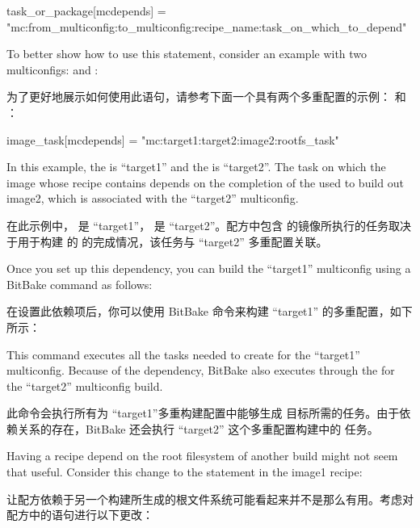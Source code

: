 \begin{pyglist}
task_or_package[mcdepends] = "mc:from_multiconfig:to_multiconfig:recipe_name:task_on_which_to_depend"
\end{pyglist}

To better show how to use this statement, consider an example with two multiconfigs:  and :

为了更好地展示如何使用此语句，请参考下面一个具有两个多重配置的示例： 和 ：

\begin{pyglist}
image_task[mcdepends] = "mc:target1:target2:image2:rootfs_task"
\end{pyglist}

In this example, the  is ``target1'' and the  is ``target2''. The task on which the image whose recipe contains  depends on the completion of the  used to build out image2, which is associated with the ``target2'' multiconfig.

在此示例中，  是 ``target1''， 是 ``target2''。配方中包含  的镜像所执行的任务取决于用于构建  的  的完成情况，该任务与 ``target2'' 多重配置关联。

Once you set up this dependency, you can build the ``target1'' multiconfig using a BitBake command as follows:

在设置此依赖项后，你可以使用 BitBake 命令来构建 ``target1'' 的多重配置，如下所示：


This command executes all the tasks needed to create  for the ``target1'' multiconfig. Because of the dependency, BitBake also executes through the  for the ``target2'' multiconfig build.

此命令会执行所有为 ``target1''多重构建配置中能够生成  目标所需的任务。由于依赖关系的存在，BitBake 还会执行 ``target2'' 这个多重配置构建中的  任务。

Having a recipe depend on the root filesystem of another build might not seem that useful. Consider this change to the statement in the image1 recipe:

让配方依赖于另一个构建所生成的根文件系统可能看起来并不是那么有用。考虑对  配方中的语句进行以下更改：

